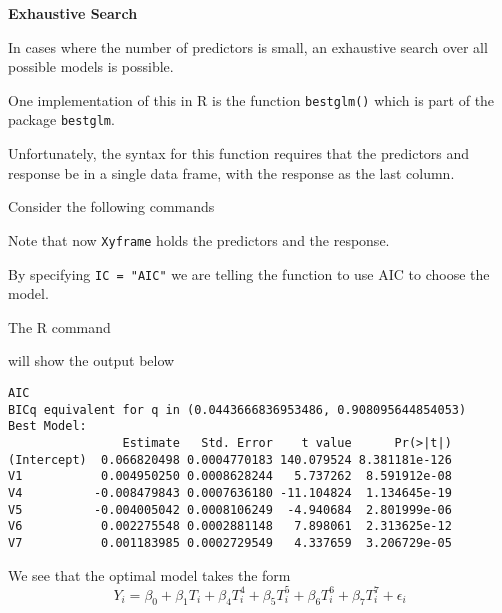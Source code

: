 \documentclass{report}
\begin{document}
{\bf Exhaustive Search}

In cases where the number of predictors is small, an exhaustive search
over all possible models is possible.

One implementation of this in R is the function {\tt bestglm()} which
is part of the package {\tt bestglm}.

Unfortunately, the syntax for this function requires that the predictors
and response be in a single data frame, with the response as the last
column.

Consider the following commands



Note that now {\tt Xyframe} holds the predictors and the response.


By specifying {\tt IC = "AIC"} we are telling the function
to use AIC to choose the model.

\newpage
The R command


\vspace{-.4in}
will show the output below

\vspace{-.2in}
\normalsize
\begin{verbatim}
AIC
BICq equivalent for q in (0.0443666836953486, 0.908095644854053)
Best Model:
                Estimate   Std. Error    t value      Pr(>|t|)
(Intercept)  0.066820498 0.0004770183 140.079524 8.381181e-126
V1           0.004950250 0.0008628244   5.737262  8.591912e-08
V4          -0.008479843 0.0007636180 -11.104824  1.134645e-19
V5          -0.004005042 0.0008106249  -4.940684  2.801999e-06
V6           0.002275548 0.0002881148   7.898061  2.313625e-12
V7           0.001183985 0.0002729549   4.337659  3.206729e-05
\end{verbatim}
\Large


\vspace{-.4in}
We see that the optimal model takes the form
\[
   Y_i = \beta_0 + \beta_1 T_i + \beta_4 T_i^4 + \beta_5 T_i^5 + \beta_6 T_i^6 + \beta_7 T_i^7 + \epsilon_i
\]
\newpage
\end{document}
